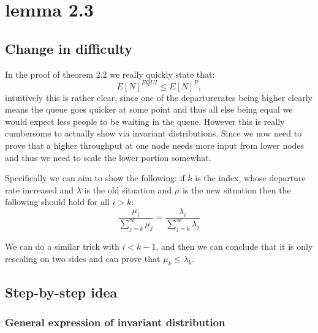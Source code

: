 \chapter{lemma 2.3}\label{ch_lemma2_3}

\section{Change in difficulty}
In the proof of theorem 2.2 we really quickly state that:
$$E[N]^{EQUI} \leq E[N]^P,$$
intuitively this is rather clear, since one of the departurerates being higher clearly means the
queue goes quicker at some point and thus all else being equal we would expect less people to be waiting
in the queue. However this is really cumbersome to actually show via invariant distributions.
Since we now need to prove that a higher throughput at one node needs more input from lower nodes
and thus we need to scale the lower portion somewhat.

Specifically we can aim to show the following:
if $k$ is the index, whose departure rate increased and $\lambda$ is the old situation and $\mu$
is the new situation then the following should hold for all $i > k$:
$$\frac{\mu_i}{\sum_{j=k}^\infty \mu_j} = \frac{\lambda_i}{\sum_{j=k}^\infty \lambda_j}$$

We can do a similar trick with $i < k - 1$, and then we can conclude that it is only rescaling on two
sides and can prove that $\mu_k \leq \lambda_k$.


\section{Step-by-step idea}

\subsection{General expression of invariant distribution}



